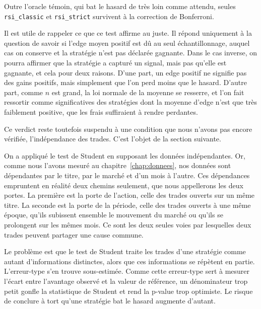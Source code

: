 


Outre l'oracle témoin, qui bat le hasard de très loin comme attendu,
seules \texttt{rsi\_classic} et \texttt{rsi\_strict} survivent à la
correction de Bonferroni.

Il est utile de rappeler ce que ce test affirme au juste. Il répond
uniquement à la question de savoir si l'edge moyen positif est dû au
seul échantillonnage, auquel cas on conserve \Hzero{} et la stratégie
n'est pas déclarée gagnante. Dans le cas inverse, on pourra affirmer que
la stratégie a capturé un signal, mais pas qu'elle est gagnante, et cela
pour deux raisons. D'une part, un edge positif ne signifie pas des gains
positifs, mais simplement que l'on perd moins que le hasard. D'autre
part, comme \(n\) est grand, la loi normale de la moyenne se resserre,
et l'on fait ressortir comme significatives des stratégies dont la
moyenne d'edge n'est que très faiblement positive, que les frais
suffiraient à rendre perdantes.


Ce verdict reste toutefois suspendu à une condition que nous n'avons pas
encore vérifiée, l'indépendance des trades. C'est l'objet de la section
suivante.


On a appliqué le test de Student en supposant les données indépendantes.
Or, comme nous l'avons mesuré au chapitre~\ref{chap:donnees}, nos
données sont dépendantes par le titre, par le marché et d'un mois à
l'autre. Ces dépendances empruntent en réalité deux chemins seulement,
que nous appellerons les deux portes. La première est la porte de
l'action, celle des trades ouverts sur un même titre. La seconde est la
porte de la période, celle des trades ouverts à une même époque, qu'ils
subissent ensemble le mouvement du marché ou qu'ils se prolongent sur
les mêmes mois. Ce sont les deux seules voies par lesquelles deux trades
peuvent partager une cause commune.

Le problème est que le test de Student traite les trades d'une stratégie
comme autant d'informations distinctes, alors que ces informations se
répètent en partie. L'erreur-type s'en trouve sous-estimée. Comme cette
erreur-type sert à mesurer l'écart entre l'avantage observé et la valeur
de référence, un dénominateur trop petit gonfle la statistique de
Student et rend la p-value trop optimiste. Le risque de conclure à tort
qu'une stratégie bat le hasard augmente d'autant.

